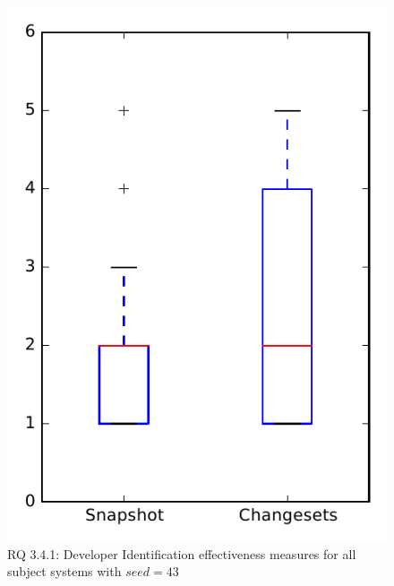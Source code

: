 
\begin{figure}
\centering
\includegraphics[height=0.4\textheight]{figures/dit_seed/rq1_overview_43}
\caption{RQ 3.4.1: Developer Identification effectiveness measures for all subject systems with $seed=43$}
\label{fig:dit_seed:rq1:overview}
\end{figure}
